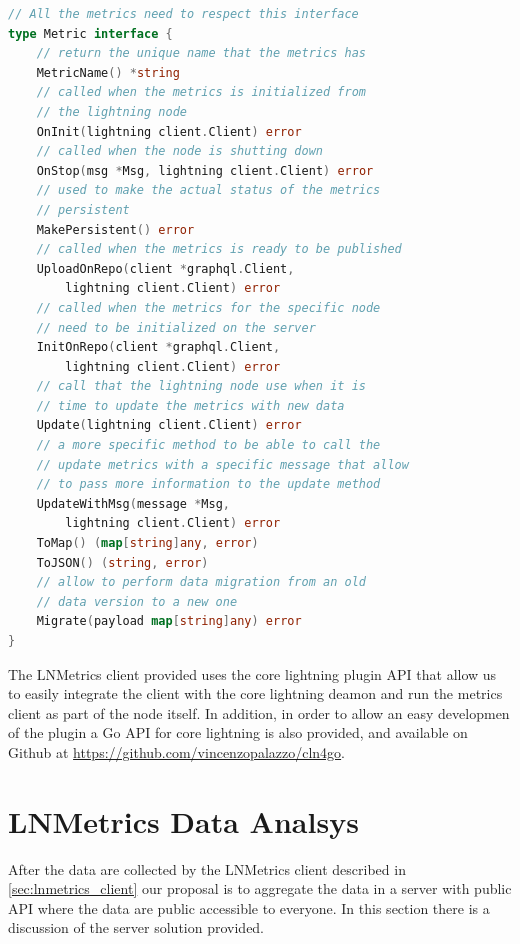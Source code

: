 \begin{lstlisting}[language=go, basicstyle=\small,
                  caption={Metric interface provided in our client reference implementation.}, 
                  label={code:lnmetric_client_inter}]
// All the metrics need to respect this interface
type Metric interface {
    // return the unique name that the metrics has
    MetricName() *string
    // called when the metrics is initialized from 
    // the lightning node
    OnInit(lightning client.Client) error
    // called when the node is shutting down
    OnStop(msg *Msg, lightning client.Client) error
    // used to make the actual status of the metrics
    // persistent
    MakePersistent() error
    // called when the metrics is ready to be published
    UploadOnRepo(client *graphql.Client, 
        lightning client.Client) error
    // called when the metrics for the specific node 
    // need to be initialized on the server
    InitOnRepo(client *graphql.Client, 
        lightning client.Client) error
    // call that the lightning node use when it is 
    // time to update the metrics with new data
    Update(lightning client.Client) error
    // a more specific method to be able to call the 
    // update metrics with a specific message that allow 
    // to pass more information to the update method
    UpdateWithMsg(message *Msg, 
        lightning client.Client) error
    ToMap() (map[string]any, error)
    ToJSON() (string, error)
    // allow to perform data migration from an old 
    // data version to a new one
    Migrate(payload map[string]any) error
}
\end{lstlisting}

The LNMetrics client provided uses the core lightning plugin API
that allow us to easily integrate the client with the core lightning deamon 
and run the metrics client as part of the node itself. 
In addition, in order to allow an easy developmen of the plugin a 
Go API for core lightning is also provided, and available on 
Github at \url{https://github.com/vincenzopalazzo/cln4go}.


\section{LNMetrics Data Analsys}
\label{sec:lnmetrics_server}

After the data are collected by the LNMetrics client described in \ref{sec:lnmetrics_client}
our proposal is to aggregate the data in a server with public API where the data are 
public accessible to everyone. In this section there is a discussion of 
the server solution provided.

